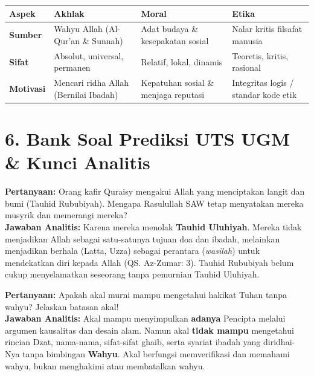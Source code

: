 \documentclass[10pt,a4paper]{article}
\begin{document}
\begin{conceptbox}
\begin{tabularx}{\textwidth}{l Y Y Y}
\toprule
\textbf{Aspek} & \textbf{Akhlak} & \textbf{Moral} & \textbf{Etika} \\
\midrule
\textbf{Sumber} & Wahyu Allah (Al-Qur'an \& Sunnah) & Adat budaya \& kesepakatan sosial & Nalar kritis filsafat manusia \\
\textbf{Sifat} & Absolut, universal, permanen & Relatif, lokal, dinamis & Teoretis, kritis, rasional \\
\textbf{Motivasi} & Mencari ridha Allah (Bernilai Ibadah) & Kepatuhan sosial \& menjaga reputasi & Integritas logis / standar kode etik \\
\bottomrule
\end{tabularx}
\end{conceptbox}

\section*{\color{ugmblue}\Large 6. Bank Soal Prediksi UTS UGM \& Kunci Analitis}

\begin{soalbox}
\textbf{Pertanyaan:} Orang kafir Quraisy mengakui Allah yang menciptakan langit dan bumi (Tauhid Rububiyah). Mengapa Rasulullah SAW tetap menyatakan mereka musyrik dan memerangi mereka? \\
\textbf{Jawaban Analitis:} Karena mereka menolak \textbf{Tauhid Uluhiyah}. Mereka tidak menjadikan Allah sebagai satu-satunya tujuan doa dan ibadah, melainkan menjadikan berhala (Latta, Uzza) sebagai perantara (\textit{wasilah}) untuk mendekatkan diri kepada Allah (QS. Az-Zumar: 3). Tauhid Rububiyah belum cukup menyelamatkan seseorang tanpa pemurnian Tauhid Uluhiyah.
\end{soalbox}

\begin{soalbox}
\textbf{Pertanyaan:} Apakah akal murni mampu mengetahui hakikat Tuhan tanpa wahyu? Jelaskan batasan akal! \\
\textbf{Jawaban Analitis:} Akal mampu menyimpulkan \textbf{adanya} Pencipta melalui argumen kausalitas dan desain alam. Namun akal \textbf{tidak mampu} mengetahui rincian Dzat, nama-nama, sifat-sifat ghaib, serta syariat ibadah yang diridhai-Nya tanpa bimbingan \textbf{Wahyu}. Akal berfungsi memverifikasi dan memahami wahyu, bukan menghakimi atau membatalkan wahyu.
\end{soalbox}
\end{document}

